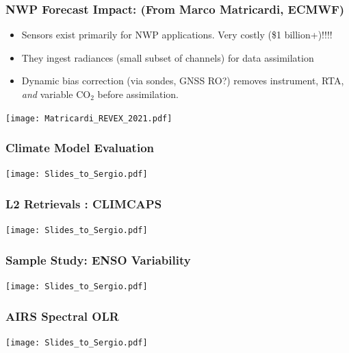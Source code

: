 \documentclass[10pt,t]{beamer}
\begin{document}
\begin{frame}
  \frametitle{NWP Forecast Impact: \small (From Marco Matricardi, ECMWF)}
  \vspace{-0.1in}
  \begin{small}
  \begin{itemize}
  \item Sensors exist primarily for NWP applications.  Very costly (\$1 billion+)!!!!
  \item They ingest radiances (small subset of channels) for data assimilation
  \item Dynamic bias correction (via sondes, GNSS RO?) removes instrument, RTA, \textit{and} variable CO$_2$ before assimilation.
\end{itemize}
  \end{small}
  \vspace{-0.45in}
  \texttt{[image: Matricardi\_REVEX\_2021.pdf]}
\end{frame}
\begin{frame}
\frametitle{Climate Model Evaluation}  
\vspace{-0.35in}
\begin{center}
\texttt{[image: Slides\_to\_Sergio.pdf]}
\end{center}
\end{frame}
\begin{frame}
\frametitle{L2 Retrievals : CLIMCAPS}  
\vspace{-0.35in}
\begin{center}
\texttt{[image: Slides\_to\_Sergio.pdf]}
\end{center}
\end{frame}
\begin{frame}
\frametitle{Sample Study: ENSO Variability}  
\vspace{-0.35in}
\begin{center}
\texttt{[image: Slides\_to\_Sergio.pdf]}
\end{center}
\end{frame}
\begin{frame}
\frametitle{AIRS Spectral OLR}  
\vspace{-0.35in}
\begin{center}
\texttt{[image: Slides\_to\_Sergio.pdf]}
\end{center}
\end{frame}
\end{document}
